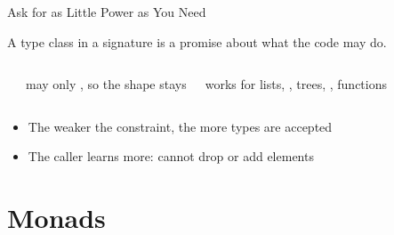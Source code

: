 \begin{frame}{Ask for as Little Power as You Need}
\centering
{\small A type class in a signature is a promise about what the code may do.\par}
\vspace{2mm}
\begin{fullwidth}
\begin{columns}[t,onlytextwidth]
\centering
{}\\[1mm]
{\small may only , so the shape stays\par}
\vspace{1mm}
{\small works for lists, , trees, , functions\par}
\centering
{}
\end{columns}
\end{fullwidth}
\vspace{3mm}
\begin{itemize}
   \item<3-> The weaker the constraint, the more types are accepted
   \item<4-> The caller learns more:  cannot drop or add elements
\end{itemize}
\end{frame}





\section{Monads}


